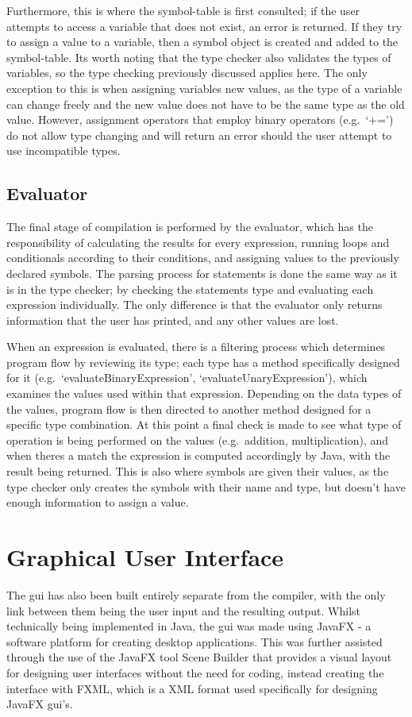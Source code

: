 \documentclass[
]{report}
\begin{document}
Furthermore, this is where the \gls{symbol-table} is first consulted; if the
user attempts to access a variable that does not exist, an error is
returned. If they try to assign a value to a variable, then a \gls{symbol}
object is created and added to the \gls{symbol-table}. Its worth noting that
the type checker also validates the types of variables, so the type
checking previously discussed applies here. The only exception to this
is when assigning variables new values, as the type of a variable can
change freely and the new value does not have to be the same type as the
old value. However, assignment operators that employ binary operators
(e.g.~`+=') do not allow type changing and will return an error should
the user attempt to use incompatible types.

\subsection{Evaluator}
The final stage of compilation is performed by the evaluator, which has
the responsibility of calculating the results for every \gls{expression},
running loops and conditionals according to their conditions, and
assigning values to the previously declared \glspl{symbol}. The \gls{parsing} process
for \glspl{statement} is done the same way as it is in the type checker; by
checking the \glspl{statement} type and evaluating each \gls{expression}
individually. The only difference is that the evaluator only returns
information that the user has printed, and any other values are lost.

When an \gls{expression} is evaluated, there is a filtering process which
determines program flow by reviewing its type; each type has
a method specifically designed for it (e.g.~`evaluateBinaryExpression',
`evaluateUnaryExpression'), which examines the values used within that
\gls{expression}. Depending on the data types of the values, program flow is
then directed to another method designed for a specific type
combination. At this point a final check is made to see what type of
operation is being performed on the values (e.g.~addition,
multiplication), and when theres a match the \gls{expression} is computed
accordingly by Java, with the result being returned. This is also where
\glspl{symbol} are given their values, as the type checker only creates the
\glspl{symbol} with their name and type, but doesn't have enough information to
assign a value.

\section{Graphical User Interface}
The \acrshort{gui} has also been built entirely separate from the compiler, with
the only link between them being the user input and the resulting
output. Whilst technically being implemented in Java, the \acrshort{gui} was made
using JavaFX - a software platform for creating desktop applications.
This was further assisted through the use of the JavaFX tool Scene
Builder that provides a visual layout for designing user interfaces
without the need for coding, instead creating the interface with FXML,
which is a XML format used specifically for designing JavaFX \acrshort{gui}'s.
\end{document}
